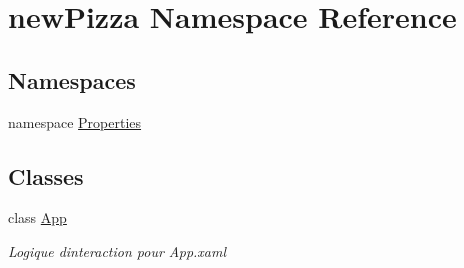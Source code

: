 \hypertarget{namespacenewPizza}{}\section{new\+Pizza Namespace Reference}
\label{namespacenewPizza}
\subsection*{Namespaces}
\begin{DoxyCompactItemize}
\item 
namespace \hyperlink{namespacenewPizza_1_1Properties}{Properties}
\end{DoxyCompactItemize}
\subsection*{Classes}
\begin{DoxyCompactItemize}
\item 
class \hyperlink{classnewPizza_1_1App}{App}
\begin{DoxyCompactList}\small\item\em Logique d\textquotesingle{}interaction pour App.\+xaml \end{DoxyCompactList}\end{DoxyCompactItemize}
